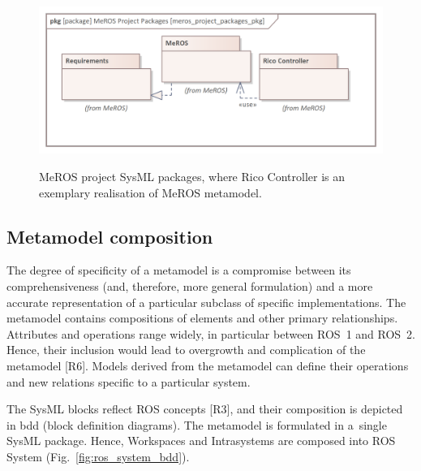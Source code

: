 \documentclass[11pt,oneside,a4paper]{article}
\begin{document}
	\begin{figure}[H]
		\centering
		\begin{center}
			{\includegraphics[scale=1.0]{img/meros_project_packages_pkg.png}}
		\end{center}
		\caption{MeROS project SysML packages, where Rico Controller is an exemplary realisation of MeROS metamodel.} 
		\label{fig:meros_project_packages_pkg}
	\end{figure}
	
\subsection{Metamodel composition}
\label{sec:metamodel-composition}

	The degree of specificity of a metamodel is a compromise between its comprehensiveness (and, therefore, more general formulation) and a more accurate representation of a particular subclass of specific implementations. The metamodel contains compositions of elements and other primary relationships. Attributes and operations range widely, in particular between ROS~1 and ROS~2. Hence, their inclusion would lead to overgrowth and complication of the metamodel [R6]. Models derived from the metamodel can define their operations and new relations specific to a particular system. 
	
	The SysML blocks reflect ROS concepts [R3], and their composition is depicted in bdd (block definition diagrams). The metamodel is formulated in a~single SysML package. Hence, Workspaces and Intrasystems are composed into ROS System (Fig.~\ref{fig:ros_system_bdd}). 
	
\end{document}
